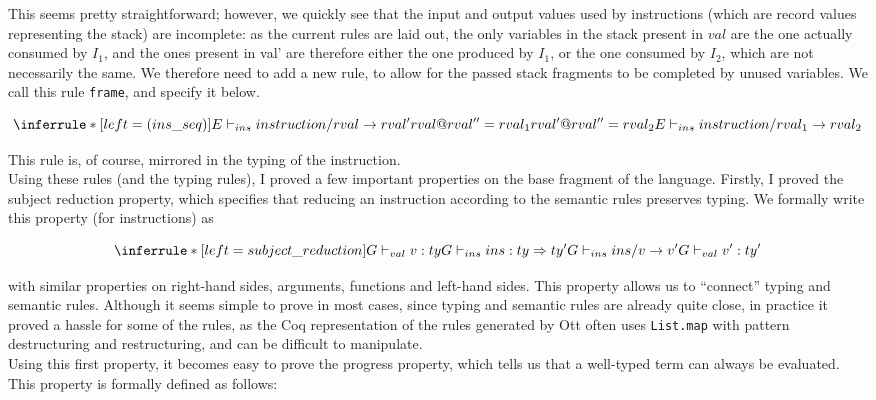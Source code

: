 \documentclass{report}
\begin{document}
This seems pretty straightforward; however, we quickly see that the input and output values used by instructions (which are record values representing the stack) are incomplete: as the current rules are laid out, the only variables in the stack present in $val$ are the one actually consumed by $I_1$, and the ones present in val' are therefore either the one produced by $I_1$, or the one consumed by $I_2$, which are not necessarily the same. We therefore need to add a new rule, to allow for the passed stack fragments to be completed by unused variables. We call this rule \texttt{frame}, and specify it below.

$$
\inferrule* [left=(ins\_seq)]
    { E \vdash_{ins} instruction / rval \rightarrow rval' \\
      rval @ rval'' = rval_1 \\
      rval' @ rval'' = rval_2 }
    { E \vdash_{ins} instruction / rval_1 \rightarrow rval_2 }
$$

This rule is, of course, mirrored in the typing of the instruction.\\

Using these rules (and the typing rules), I proved a few important properties on the base fragment of the language. Firstly, I proved the subject reduction property, which specifies that reducing an instruction according to the semantic rules preserves typing. We formally write this property (for instructions) as

$$
\inferrule* [left=subject\_reduction]
            { G \vdash_{val} v : ty \\ G \vdash_{ins} ins : ty \Rightarrow ty' \\ G \vdash_{ins} ins / v \rightarrow v' }
            { G \vdash_{val} v' : ty' }
$$

with similar properties on right-hand sides, arguments, functions and left-hand sides. This property allows us to ``connect'' typing and semantic rules. Although it seems simple to prove in most cases, since typing and semantic rules are already quite close, in practice it proved a hassle for some of the rules, as the Coq representation of the rules generated by Ott often uses \texttt{List.map} with pattern destructuring and restructuring, and can be difficult to manipulate.\\

Using this first property, it becomes easy to prove the progress property, which tells us that a well-typed term can always be evaluated. This property is formally defined as follows:
\end{document}
